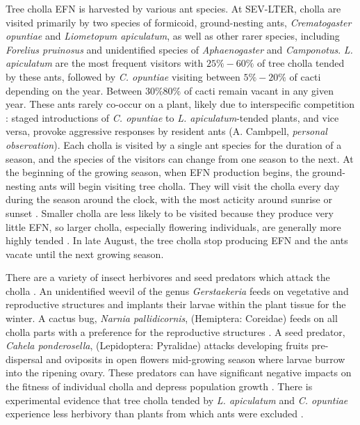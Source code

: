 \documentclass[11pt]{article}
\begin{document}
Tree cholla EFN is harvested by various ant species. 
At SEV-LTER, cholla are visited primarily by two species of formicoid, ground-nesting ants, \textit{Crematogaster opuntiae} and \textit{Liometopum apiculatum}, as well as other rarer species, including \textit{Forelius pruinosus} and unidentified species of \textit{Aphaenogaster} and \textit{Camponotus}.
\textit{L. apiculatum} are the most frequent visitors with $25\% - 60\%$ of tree cholla tended by these ants, followed by \textit{C. opuntiae} visiting between $5\% - 20\%$ of cacti \citep{Donald2022} depending on the year. Between $ 30\% 80\%$ of cacti remain vacant in any given year. 
These ants rarely co-occur on a plant, likely due to interspecific competition \citep{Miller2007}: staged introductions of \textit{C. opuntiae} to \textit{L. apiculatum}-tended plants, and vice versa, provoke aggressive responses by resident ants (A. Cambpell, \textit{personal observation}).
Each cholla is visited by a single ant species for the duration of a season, and the species of the visitors can change from one season to the next. 
At the beginning of the growing season, when EFN production begins, the ground-nesting ants will begin visiting tree cholla.
They will visit the cholla every day during the season around the clock, with the most acticity around sunrise or sunset \citep{Ohm2014}. 
Smaller cholla are less likely to be visited because they produce very little EFN, so larger cholla, especially flowering individuals, are generally more highly tended \citep{Miller2014}. 
In late August, the tree cholla stop producing EFN and the ants vacate until the next growing season. 

There are a variety of insect herbivores and seed predators which attack the cholla \citep{Mann1969}. 
An unidentified weevil of the genus \textit{Gerstaekeria} feeds on vegetative and reproductive structures and implants their larvae within the plant tissue for the winter. 
A cactus bug, \textit{Narnia pallidicornis}, (Hemiptera: Coreidae) feeds on all cholla parts with a preference for the reproductive structures \citep{Miller2006}.
A seed predator, \textit{Cahela ponderosella}, (Lepidoptera: Pyralidae) attacks developing fruits pre-dispersal and oviposits in open flowers mid-growing season where larvae burrow into the ripening ovary. 
These predators can have significant negative impacts on the fitness of individual cholla and depress population growth \citep{Miller2009}.
There is experimental evidence that tree cholla tended by \textit{L. apiculatum} and \textit{C. opuntiae} experience less herbivory than plants from which ants were excluded \citep{Miller2007}. 
\end{document}
